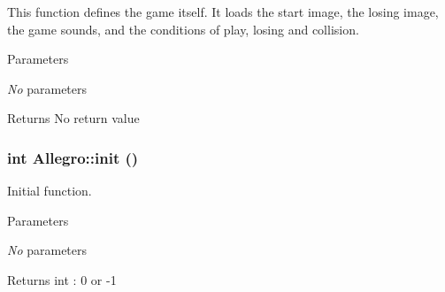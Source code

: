 This function defines the game itself. It loads the start image, the losing image, the game sounds, and the conditions of play, losing and collision. 
\begin{DoxyParams}{Parameters}
\item[{\em No}]parameters \end{DoxyParams}
\begin{DoxyReturn}{Returns}
No return value 
\end{DoxyReturn}
\hypertarget{classAllegro_a5e00fb24164087bd89b0d6bfc6b319b7}{
\subsubsection[{init}]{\setlength{\rightskip}{0pt plus 5cm}int Allegro::init ()}}
\label{classAllegro_a5e00fb24164087bd89b0d6bfc6b319b7}


Initial function. 
\begin{DoxyParams}{Parameters}
\item[{\em No}]parameters \end{DoxyParams}
\begin{DoxyReturn}{Returns}
int : 0 or -\/1 
\end{DoxyReturn}


